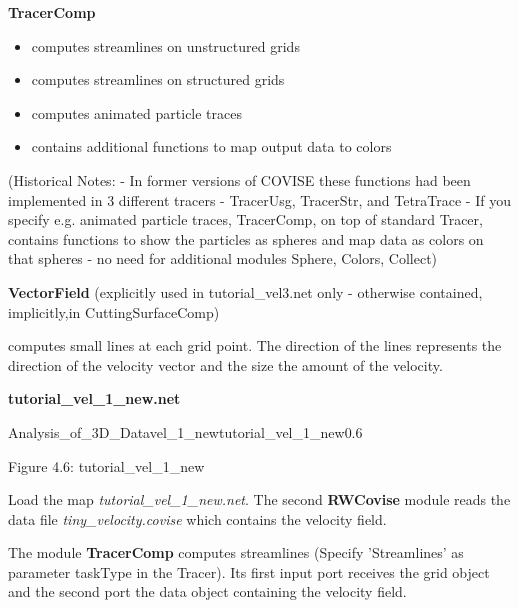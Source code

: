 {\bf TracerComp} 
\begin{itemize}
\item computes streamlines on unstructured grids
\item computes streamlines on structured grids
\item computes animated particle traces 
\item contains additional functions to map output data to colors
\end{itemize}
(Historical Notes: \newline 
- In former versions of COVISE these functions had been implemented in 3 different tracers - TracerUsg, TracerStr,
and TetraTrace \newline
- If you specify e.g. animated particle traces, TracerComp, on top of standard Tracer, contains functions to show the
particles as spheres and map data as colors on that spheres - no need for additional modules Sphere,
Colors, Collect)

\vspace{0.5cm}

{\bf VectorField} (explicitly used in tutorial\_vel3.net only - otherwise contained,
implicitly,in CuttingSurfaceComp)  

computes small lines at each grid point. The direction of the lines 
represents the direction of the velocity vector and the size the amount of the velocity.

\vspace{1cm}
\begin{Large}{\bf tutorial\_vel\_1\_new.net}\end{Large}
\vspace{0.5cm}

\begin{covimg}{Analysis_of_3D_Data}{vel_1_new}{tutorial\_vel\_1\_new}{0.6}\end{covimg}
\begin{htmlonly}
Figure 4.6: tutorial_vel_1_new
\vspace{0.5cm}
\end{htmlonly}

Load the map {\it tutorial\_vel\_1\_new.net}. The second {\bf RWCovise} module reads the data 
file {\it tiny\_velocity.covise} which contains the velocity field. 

The module {\bf TracerComp} computes streamlines (Specify 'Streamlines' as parameter taskType in the Tracer).
Its first input port receives the grid 
object and the second port the data object containing the velocity field. 

